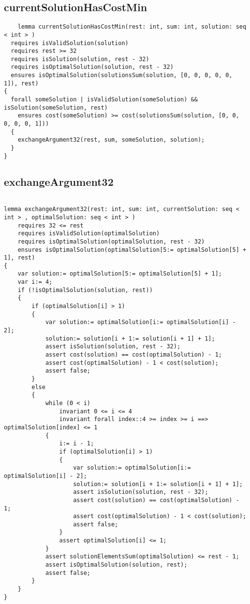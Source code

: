 \subsection{currentSolutionHasCostMin}
\begin{lstlisting}
    lemma currentSolutionHasCostMin(rest: int, sum: int, solution: seq < int > )
  requires isValidSolution(solution)
  requires rest >= 32
  requires isSolution(solution, rest - 32)
  requires isOptimalSolution(solution, rest - 32)
  ensures isOptimalSolution(solutionsSum(solution, [0, 0, 0, 0, 0, 1]), rest) 
{
  forall someSolution | isValidSolution(someSolution) && isSolution(someSolution, rest)
    ensures cost(someSolution) >= cost(solutionsSum(solution, [0, 0, 0, 0, 0, 1])) 
  {
    exchangeArgument32(rest, sum, someSolution, solution);
  }
}

\end{lstlisting}


\subsection{exchangeArgument32}
\begin{lstlisting}
    
lemma exchangeArgument32(rest: int, sum: int, currentSolution: seq < int > , optimalSolution: seq < int > )
    requires 32 <= rest
    requires isValidSolution(optimalSolution)
    requires isOptimalSolution(optimalSolution, rest - 32)
    ensures isOptimalSolution(optimalSolution[5:= optimalSolution[5] + 1], rest) 
{
    var solution:= optimalSolution[5:= optimalSolution[5] + 1];
    var i:= 4;
    if (!isOptimalSolution(solution, rest)) 
    {
        if (optimalSolution[i] > 1) 
        {
            var solution:= optimalSolution[i:= optimalSolution[i] - 2];
            solution:= solution[i + 1:= solution[i + 1] + 1];
            assert isSolution(solution, rest - 32);
            assert cost(solution) == cost(optimalSolution) - 1;
            assert cost(optimalSolution) - 1 < cost(solution);
            assert false;
        } 
        else
        {
            while (0 < i)
                invariant 0 <= i <= 4
                invariant forall index::4 >= index >= i ==> optimalSolution[index] <= 1 
            {
                i:= i - 1;
                if (optimalSolution[i] > 1) 
                {
                    var solution:= optimalSolution[i:= optimalSolution[i] - 2];
                    solution:= solution[i + 1:= solution[i + 1] + 1];
                    assert isSolution(solution, rest - 32);
                    assert cost(solution) == cost(optimalSolution) - 1;
                    assert cost(optimalSolution) - 1 < cost(solution);
                    assert false;
                }
                assert optimalSolution[i] <= 1;
            }
            assert solutionElementsSum(optimalSolution) <= rest - 1;
            assert isOptimalSolution(solution, rest);
            assert false;
        }
    }
}

\end{lstlisting}

